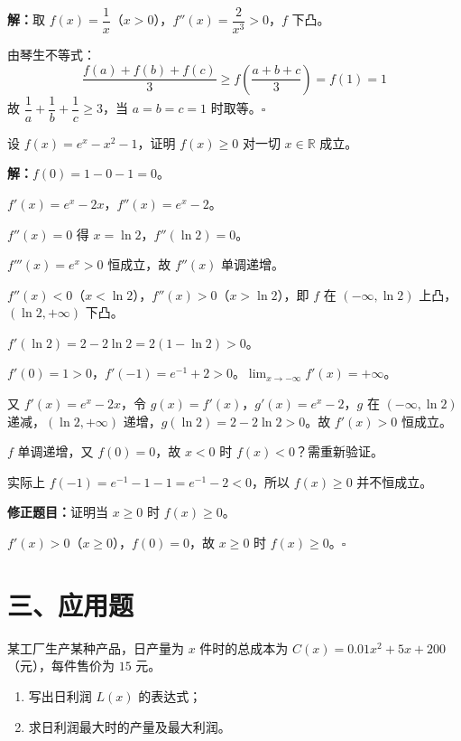 \documentclass[12pt, a4paper]{ctexart}
\begin{document}
\textbf{解：}\quad 取 $f(x)=\dfrac{1}{x}$（$x>0$），$f''(x)=\dfrac{2}{x^3}>0$，$f$ 下凸。\par
由琴生不等式：
\[
\frac{f(a)+f(b)+f(c)}{3}\geq f\!\left(\frac{a+b+c}{3}\right)=f(1)=1
\]
故 $\dfrac{1}{a}+\dfrac{1}{b}+\dfrac{1}{c}\geq 3$，当 $a=b=c=1$ 时取等。\hfill$\square$

\begin{examplebox}[【例题10】导数、零点与凹凸性的综合]
设 $f(x)=e^x-x^2-1$，证明 $f(x)\geq 0$ 对一切 $x\in\mathbb{R}$ 成立。
\end{examplebox}

\textbf{解：}\quad $f(0)=1-0-1=0$。\par
$f'(x)=e^x-2x$，$f''(x)=e^x-2$。\par
$f''(x)=0$ 得 $x=\ln 2$，$f''(\ln 2)=0$。\par
$f'''(x)=e^x>0$ 恒成立，故 $f''(x)$ 单调递增。\par
$f''(x)<0$（$x<\ln 2$），$f''(x)>0$（$x>\ln 2$），即 $f$ 在 $(-\infty,\ln 2)$ 上凸，$(\ln 2,+\infty)$ 下凸。\par
$f'(\ln 2)=2-2\ln 2=2(1-\ln 2)>0$。\par
$f'(0)=1>0$，$f'(-1)=e^{-1}+2>0$。$\lim_{x\to-\infty}f'(x)=+\infty$。\par
又 $f'(x)=e^x-2x$，令 $g(x)=f'(x)$，$g'(x)=e^x-2$，$g$ 在 $(-\infty,\ln 2)$ 递减，$(\ln 2,+\infty)$ 递增，$g(\ln 2)=2-2\ln 2>0$。故 $f'(x)>0$ 恒成立。\par
$f$ 单调递增，又 $f(0)=0$，故 $x<0$ 时 $f(x)<0$？需重新验证。\par
实际上 $f(-1)=e^{-1}-1-1=e^{-1}-2<0$，所以 $f(x)\geq 0$ 并不恒成立。\par
\textbf{修正题目：}证明当 $x\geq 0$ 时 $f(x)\geq 0$。\par
$f'(x)>0$（$x\geq 0$），$f(0)=0$，故 $x\geq 0$ 时 $f(x)\geq 0$。\hfill$\square$

\section*{\textcolor{apppurple}{三、应用题}}

\begin{appbox}[【应用1】利润最大化与函数分析]
某工厂生产某种产品，日产量为 $x$ 件时的总成本为 $C(x)=0.01x^2+5x+200$（元），每件售价为 $15$ 元。
\begin{enumerate}[leftmargin=1.5em]
  \item 写出日利润 $L(x)$ 的表达式；
  \item 求日利润最大时的产量及最大利润。
\end{enumerate}
\end{appbox}
\end{document}

